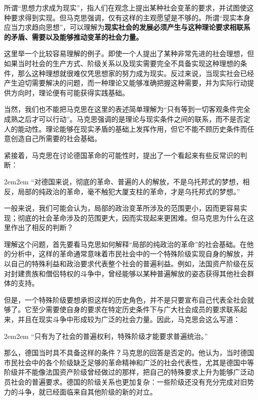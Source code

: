 \documentclass[a4paper,twoside,12pt,AutoFakeBold]{ctexart}
\begin{document}
所谓“思想力求成为现实”，指人们在观念上提出某种社会变革的要求，并试图使这种要求得到实现。但马克思强调，仅有这样的主观愿望是不够的。所谓“现实本身应当力求趋向思想”，可以理解为\textbf{现实社会的发展必须产生与这种理论要求相联系的矛盾、需要以及能够推动变革的社会力量。}

这里举一个比较容易理解的例子。即使一个人提出了某种非常先进的社会理想，但如果当时社会的生产方式、阶级关系以及现实需要完全不具备实现这种理想的条件，那么这种理想就很难仅凭思想家的努力成为现实。反过来说，当现实社会已经产生迫切需要解决的问题，而一种理论又能够准确把握这种需要，并为实际行动提供方向时，理论便有可能获得实践基础。

当然，我们也不能把马克思在这里的表述简单理解为“只有等到一切客观条件完全成熟之后才可以行动”。马克思强调的是理论与现实条件之间的联系，而不是否定人的能动性。理论能够在现实矛盾的基础上发挥作用，但它不能不顾历史条件而任意创造自己所需要的社会基础。


紧接着，马克思在讨论德国革命的可能性时，提出了一个看起来有些反常识的判断：

\begin{adjustwidth}{2em}{2em}
\qquad\fangsong
“对德国来说，彻底的革命、普遍的人的解放，不是乌托邦式的梦想，相反，局部的纯政治的革命，毫不触犯大厦支柱的革命，才是乌托邦式的梦想。”
\end{adjustwidth}

一般来说，我们可能会认为，局部的政治变革所涉及的范围更小，因而更容易实现；彻底的社会革命涉及的范围更大，因而实现起来更困难。但马克思为什么在这里作出了相反的判断？

理解这个问题，首先要看马克思如何解释“局部的纯政治的革命”的社会基础。在他的分析中，这样的革命通常意味着市民社会中的一个特殊阶级实现自身的解放，并以自己的特殊利益和政治要求代表整个社会的普遍利益。例如，法国资产阶级在反对封建贵族和僧侣特权的斗争中，曾经能够以某种普遍解放的姿态获得其他社会群体的支持。

但是，一个特殊阶级要想承担这样的历史角色，并不是只要宣布自己代表全社会就够了。它至少需要使自身的要求在特定历史条件下与广大社会成员的要求联系起来，并且在现实斗争中形成较为广泛的社会力量。因此，马克思会这么写道：

\begin{adjustwidth}{2em}{2em}
\qquad\fangsong
“只有为了社会的普遍权利，特殊阶级才能要求普遍统治。”
\end{adjustwidth}

那么，德国当时具不具备这样的条件？马克思的回答是否定的。他认为，当时德国市民社会中的各个阶级缺乏足够的革命精神和广泛的社会代表性，尤其是德国中等阶级并不能像法国资产阶级曾经做过的那样，把自己的特殊要求上升为能够广泛动员社会的普遍要求。德国的阶级关系也更加复杂：一些阶级还没有充分完成对旧势力的斗争，就已经面临来自其他阶级的新的对立。
\end{document}
